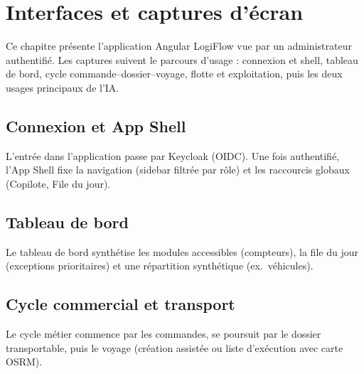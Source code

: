 \chapter{Interfaces et captures d'écran}
\label{chap:captures}

Ce chapitre présente l'application Angular LogiFlow vue par un administrateur authentifié.
Les captures suivent le parcours d'usage : connexion et shell, tableau de bord, cycle
commande--dossier--voyage, flotte et exploitation, puis les deux usages principaux de l'IA.

\section{Connexion et App Shell}

L'entrée dans l'application passe par Keycloak (OIDC). Une fois authentifié, l'App Shell
fixe la navigation (sidebar filtrée par rôle) et les raccourcis globaux (Copilote, File du jour).



\section{Tableau de bord}

Le tableau de bord synthétise les modules accessibles (compteurs), la file du jour
(exceptions prioritaires) et une répartition synthétique (ex.\ véhicules).


\section{Cycle commercial et transport}

Le cycle métier commence par les commandes, se poursuit par le dossier transportable,
puis le voyage (création assistée ou liste d'exécution avec carte OSRM).




